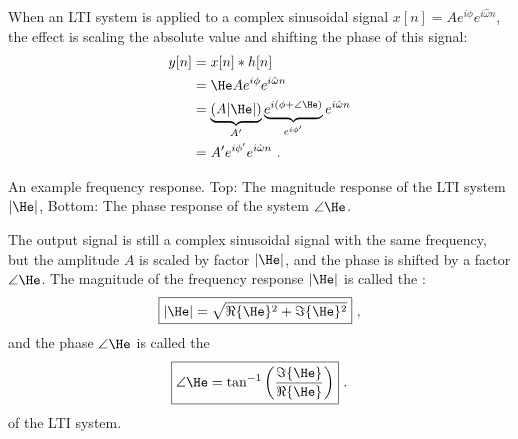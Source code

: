 When an LTI system is applied to a complex sinusoidal signal $x[n]=A
e^{i\phi}e^{i\hat{\omega}n}$, the effect is scaling the absolute value and
shifting the phase of this signal:
\begin{align}
y[n] &= x[n]*h[n]\\
     &= \He A e^{i\phi}e^{i\hat{\omega}n} \\
     &= \underbrace{(A|\He|)}_{A'}\underbrace{e^{i(\phi + \angle \He)}}_{e^{i\phi'}} e^{i\hat{\omega} n}\\
     &= A' e^{i\phi'} e^{i\hat{\omega} n} \,\,.
\end{align}
\begin{marginfigure}
\begin{center}
\end{center}
\caption{An example frequency response. Top: The magnitude response of the LTI system $|\He|$, Bottom: The phase response of the system $\angle \He$.}
\label{fig:he_example_lpf}
\end{marginfigure}

The output signal is still a complex sinusoidal signal with the same
frequency, but the amplitude $A$ is scaled by factor $|\He|$, and the
phase is shifted by a factor $\angle \He$. The magnitude of the
frequency response $|\He|$ is called the \emph{}:
\begin{equation}
\boxed{
|\He|=\sqrt{\Re\{\He\}^2+\Im\{\He\}^2}
} \,\,,
\end{equation}
and the phase $\angle \He$ is called
the \emph{}
\begin{equation}
\boxed{
\angle \He = \tan^{-1}\left(\frac{\Im\{\He\}}{\Re\{\He\}}\right)
} \,\,.
\end{equation}
of the LTI system. 

